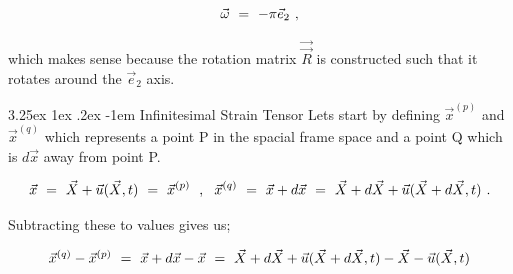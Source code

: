 \documentclass{article}
\makeatletter
\renewcommand\subparagraph{\@startsection{subparagraph}{6}{\parindent}%
  {3.25ex \@plus1ex \@minus .2ex}%
  {-1em}%
  {\normalfont\normalsize\bfseries}}
\makeatother
\begin{document}
\begin{equation} \label{eb-eq-1-66}
\vec{\omega}  \hspace{0.125cm} = \hspace{0.125cm} -\pi \vec{e}_2 \hspace{0.125cm} ,
\end{equation} 

which makes sense because the rotation matrix \begin{math} \vec{\vec{R}} \end{math} is constructed such that it rotates around the \begin{math} \vec{e}_2 \end{math} axis.

\subparagraph{Infinitesimal Strain Tensor}
Lets start by defining \begin{math}  \vec{x}^{( p )} \end{math} and \begin{math}  \vec{x}^{( q )} \end{math} which represents a point P in the spacial frame space and a point Q which is \begin{math}  d \vec{x} \end{math} away from point P.

\begin{equation} \label{eb-eq-1-67}
\vec{x}  \hspace{0.125cm} = \hspace{0.125cm} \vec{X} + \vec{u}( \vec{X} , t )  \hspace{0.125cm} = \hspace{0.125cm} \vec{x}^{( p )} \hspace{0.225cm} , \hspace{0.225cm} \vec{x}^{( q )}  \hspace{0.125cm} = \hspace{0.125cm}  \vec{x} + d \vec{x}  \hspace{0.125cm} = \hspace{0.125cm} \vec{X} + d \vec{X} + \vec{u}( \vec{X} + d \vec{X} , t ) \hspace{0.125cm}  .
\end{equation} 

Subtracting these to values gives us;

\begin{equation} \label{eb-eq-1-68}
 \vec{x}^{( q )} - \vec{x}^{( p )} \hspace{0.125cm} = \hspace{0.125cm}  \vec{x} + d \vec{x}  - \vec{x} \hspace{0.125cm} = \hspace{0.125cm} \vec{X} + d \vec{X} + \vec{u}( \vec{X} + d \vec{X} , t ) - \vec{X} -  \vec{u}( \vec{X} , t ) 
\end{equation} 
\end{document}
